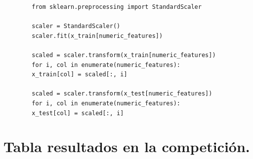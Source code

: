 	\begin{lstlisting}
		from sklearn.preprocessing import StandardScaler
		
		scaler = StandardScaler()
		scaler.fit(x_train[numeric_features])
		
		scaled = scaler.transform(x_train[numeric_features])
		for i, col in enumerate(numeric_features):
		x_train[col] = scaled[:, i]
		
		scaled = scaler.transform(x_test[numeric_features])
		for i, col in enumerate(numeric_features):
		x_test[col] = scaled[:, i]
	\end{lstlisting}
	
	\section[Resultados]{Tabla resultados en la competición.}
